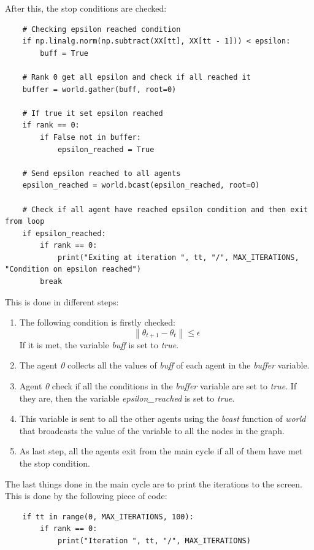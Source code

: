 \documentclass[a4paper,11pt,oneside]{book}
\begin{document}
After this, the stop conditions are checked:
\begin{lstlisting}
    # Checking epsilon reached condition
    if np.linalg.norm(np.subtract(XX[tt], XX[tt - 1])) < epsilon:
        buff = True

    # Rank 0 get all epsilon and check if all reached it
    buffer = world.gather(buff, root=0)

    # If true it set epsilon reached
    if rank == 0:
        if False not in buffer:
            epsilon_reached = True

    # Send epsilon reached to all agents
    epsilon_reached = world.bcast(epsilon_reached, root=0)

    # Check if all agent have reached epsilon condition and then exit from loop
    if epsilon_reached:
        if rank == 0:
            print("Exiting at iteration ", tt, "/", MAX_ITERATIONS, "Condition on epsilon reached")
        break
\end{lstlisting}

This is done in different steps:
\begin{enumerate}
	\item The following condition is firstly checked:
	\begin{equation}
		\left\lVert \theta_{t+1} - \theta_{t} \right\rVert
		\leq \epsilon
	\end{equation}
	If it is met, the variable \textit{buff} is set to \textit{true}. 
	\item The agent \textit{0} collects all the values of \textit{buff} of each agent in the \textit{buffer} variable.
	\item Agent \textit{0} check if all the conditions in the \textit{buffer} variable are set to \textit{true}. If they are, then the variable \textit{epsilon\_reached} is set to \textit{true}.
	\item This variable is sent to all the other agents using the \textit{bcast} function of \textit{world} that broadcasts the value of the variable to all the nodes in the graph.
	\item As last step, all the agents exit from the main cycle if all of them have met the stop condition. 
\end{enumerate}

The last things done in the main cycle are to print the iterations to the screen. This is done by the following piece of code:
\begin{lstlisting}
    if tt in range(0, MAX_ITERATIONS, 100):
        if rank == 0:
            print("Iteration ", tt, "/", MAX_ITERATIONS)
\end{lstlisting}
\end{document}

